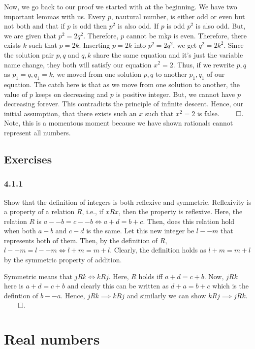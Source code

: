 \documentclass{report}
\begin{document}
Now, we go back to our proof we started with at the beginning. We have two important lemmas with us. Every $p$, nautural number, is either odd or even but not both and that if  $p$ is odd then $p^2$ is also odd. If  $p$ is odd  $p^2$ is also odd. But, we are given that  $p^2 = 2q^2$. Therefore,  $p$ cannot be mk$p$ is even. Therefore, there exists $k$ such that  $p = 2k$. Inserting $p=2k$ into $p^2 = 2q^2$, we get $q^2 = 2k^2$. Since the solution pair $p,q$ and  $q,k$ share the same equation and it's just the variable name change, they both will satisfy our equation  $x^2=2$. Thus, if we rewrite $p,q$ as  $p_1 = q, q_1=k$, we moved from one solution $p,q$ to another  $p_1,q_1$ of our equation. The catch here is that as we move from one solution to another, the value of  $p$ keeps on decreasing and $p$ is positive integer. But, we cannot have $p$ decreasing forever. This contradicts the principle of infinite descent. Hence, our initial assumption, that there exists such an $x$ such that  $x^2 = 2$ is false. $\qed$. Note, this is a momentous moment because we have shown rationals cannot represent all numbers.     

\section*{Exercises}
\subsection*{4.1.1} Show that the definition of integers is both reflexive and symmetric. Reflexivity is a property of a relation $R$, i.e., if  $xRx$, then the property is reflexive. Here, the relation $R$ is  $a--b = c--b \iff a+d = b+c$. Then, does this relation hold when both  $a-b$ and  $c-d$ is the same. Let this new integer be  $l--m$ that represents both of them. Then, by the definition of  $R$,  $l--m = l--m \iff l+m = m +l$. Clearly, the definition holds as  $l+m=m+l$ by the symmetric property of addition. 

Symmetric means that $jRk \iff kRj$. Here, $R$ holds  iff $a+d=c+b$. Now, $jRk$ here is  $a+d=c+b$ and clearly  this can be written as  $d+a=b+c$ which is the defintion of  $b--a$. Hence,  $jRk \implies kRj$ and similarly we can show  $kRj \implies jRk$. $\qed$. 



\chapter{Real numbers}
\end{document}
